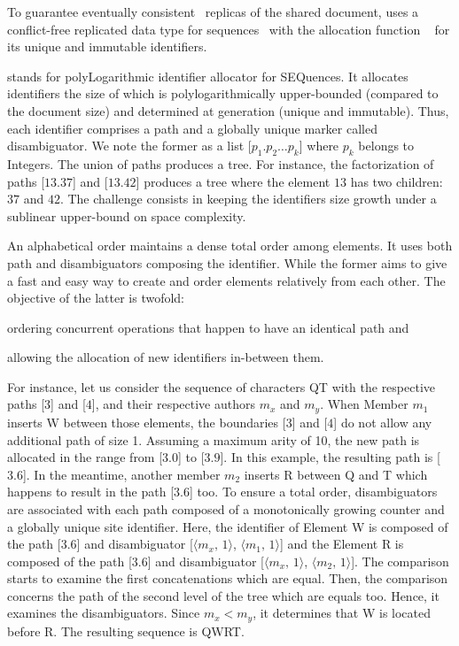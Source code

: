 To guarantee eventually consistent~\cite{bailis2013eventual} replicas of the
shared document, \CRATE uses a conflict-free replicated data type for
sequences~\cite{shapiro2011comprehensive, shapiro2011conflict} with the
allocation function \LSEQ~\cite{nedelec2013concurrency, nedelec2013lseq} for its
unique and immutable identifiers.

\LSEQ stands for polyLogarithmic identifier allocator for SEQuences. It
allocates identifiers the size of which is polylogarithmically upper-bounded
(compared to the document size) and determined at generation (unique and
immutable). Thus, each identifier comprises a path and a globally unique marker
called disambiguator. We note the former as a list [$p_1.p_2\ldots p_k$] where
$p_k$ belongs to Integers. The union of paths produces a tree. For instance, the
factorization of paths [$13.37$] and [$13.42$] produces a tree where the element
$13$ has two children: $37$ and $42$. The challenge consists in keeping the
identifiers size growth under a sublinear upper-bound on space complexity.

An alphabetical order maintains a dense total order among elements. It uses both
path and disambiguators composing the identifier. While the former aims to give
a fast and easy way to create and order elements relatively from each other. The
objective of the latter is twofold:
\begin{inparaenum}[(i)]
\item ordering concurrent operations that happen to have an identical path and
\item allowing the allocation of new identifiers in-between them.
\end{inparaenum}
For instance, let us consider the sequence of characters QT with the respective
paths [$3$] and [$4$], and their respective authors $m_x$ and $m_y$. When Member
$m_1$ inserts W between those elements, the boundaries [$3$] and [$4$] do not
allow any additional path of size 1. Assuming a maximum arity of 10, the new
path is allocated in the range from [$3.0$] to [$3.9$]. In this example, the
resulting path is [$3.6$]. In the meantime, another member $m_2$ inserts R
between Q and T which happens to result in the path [$3.6$] too. To ensure a
total order, disambiguators are associated with each path composed of a
monotonically growing counter and a globally unique site identifier.  Here, the
identifier of Element W is composed of the path [$3.6$] and disambiguator
[$\langle m_x,\,1\rangle$, $\langle m_1,\,1\rangle$] and the Element R is
composed of the path [$3.6$] and disambiguator [$\langle m_x,\,1\rangle$,
$\langle m_2,\,1\rangle$].  The comparison starts to examine the first
concatenations which are equal.  Then, the comparison concerns the path of the
second level of the tree which are equals too. Hence, it examines the
disambiguators. Since $m_x < m_y$, it determines that W is located before R. The
resulting sequence is QWRT.

